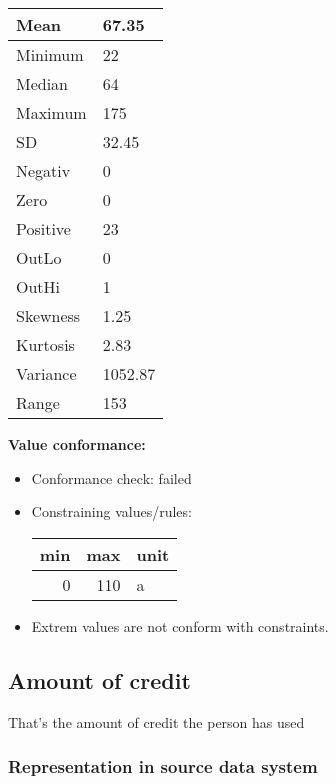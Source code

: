 \documentclass[
]{article}
\providecommand{\tightlist}{%
  \setlength{\itemsep}{0pt}\setlength{\parskip}{0pt}}
\begin{document}
\begin{table}[H]
\centering
\begin{tabular}{l|l}
\hline
Mean & 67.35\\
\hline
Minimum & 22\\
\hline
Median & 64\\
\hline
Maximum & 175\\
\hline
SD & 32.45\\
\hline
Negativ & 0\\
\hline
Zero & 0\\
\hline
Positive & 23\\
\hline
OutLo & 0\\
\hline
OutHi & 1\\
\hline
Skewness & 1.25\\
\hline
Kurtosis & 2.83\\
\hline
Variance & 1052.87\\
\hline
Range & 153\\
\hline
\end{tabular}
\end{table}

\textbf{Value conformance:}

\begin{itemize}
\tightlist
\item
  Conformance check: failed
\item
  Constraining values/rules:

  \begin{table}[H]
  \centering
  \begin{tabular}{r|r|l}
  \hline
  \textbf{min} & \textbf{max} & \textbf{unit}\\
  \hline
  0 & 110 & a\\
  \hline
  \end{tabular}
  \end{table}
\item
  Extrem values are not conform with constraints.
\end{itemize}

\newpage

\hypertarget{amount-of-credit}{%
\subsection{Amount of credit}\label{amount-of-credit}}

That's the amount of credit the person has used

\hypertarget{representation-in-source-data-system-1}{%
\subsubsection{\texorpdfstring{Representation in \textbf{source} data
system}{Representation in source data system}}\label{representation-in-source-data-system-1}}
\end{document}

